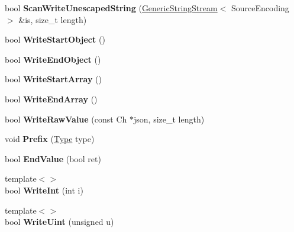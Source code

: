 \begin{DoxyCompactItemize}
\item 
bool {\bfseries Scan\+Write\+Unescaped\+String} (\hyperlink{structGenericStringStream}{Generic\+String\+Stream}$<$ Source\+Encoding $>$ \&is, size\+\_\+t length)\hypertarget{classWriter_a94140803bba7863a1b39c936bbe6d262}{}\label{classWriter_a94140803bba7863a1b39c936bbe6d262}

\item 
bool {\bfseries Write\+Start\+Object} ()\hypertarget{classWriter_a81c72a2eecd47e042f56ca93a27a5cb1}{}\label{classWriter_a81c72a2eecd47e042f56ca93a27a5cb1}

\item 
bool {\bfseries Write\+End\+Object} ()\hypertarget{classWriter_a7e3f6760a50a72f4217a9b2d625c43ee}{}\label{classWriter_a7e3f6760a50a72f4217a9b2d625c43ee}

\item 
bool {\bfseries Write\+Start\+Array} ()\hypertarget{classWriter_a3c3560a96cac58f98f4a74d6cb227204}{}\label{classWriter_a3c3560a96cac58f98f4a74d6cb227204}

\item 
bool {\bfseries Write\+End\+Array} ()\hypertarget{classWriter_aabda2df1be6e83cef416e9b1f042e8f4}{}\label{classWriter_aabda2df1be6e83cef416e9b1f042e8f4}

\item 
bool {\bfseries Write\+Raw\+Value} (const Ch $\ast$json, size\+\_\+t length)\hypertarget{classWriter_a8ee1135b2595261819b134907f67614e}{}\label{classWriter_a8ee1135b2595261819b134907f67614e}

\item 
void {\bfseries Prefix} (\hyperlink{rapidjson_8h_a1d1cfd8ffb84e947f82999c682b666a7}{Type} type)\hypertarget{classWriter_a1fc40f8b9f3abc2548c0c5782ce1755d}{}\label{classWriter_a1fc40f8b9f3abc2548c0c5782ce1755d}

\item 
bool {\bfseries End\+Value} (bool ret)\hypertarget{classWriter_adc1cadbabc309d31f19cf7463251d879}{}\label{classWriter_adc1cadbabc309d31f19cf7463251d879}

\item 
{\footnotesize template$<$$>$ }\\bool {\bfseries Write\+Int} (int i)\hypertarget{classWriter_abefb163a93b376d056edecad5a7a82ef}{}\label{classWriter_abefb163a93b376d056edecad5a7a82ef}

\item 
{\footnotesize template$<$$>$ }\\bool {\bfseries Write\+Uint} (unsigned u)\hypertarget{classWriter_a9665a4a1549b286944b21927b80060cf}{}\label{classWriter_a9665a4a1549b286944b21927b80060cf}


\end{DoxyCompactItemize}
